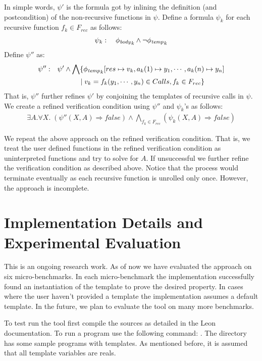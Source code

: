 \documentclass[a4paper,10pt]{article}
\begin{document}
In simple words, $\psi'$ is the formula got by inlining the definition (and postcondition) of the non-recursive functions in $\psi$.
Define a formula $\psi_k$ for each recursive function $f_k \in F_{rec}$ as follows:
%
\begin{align*}
\psi_k: \quad \mathit{\phi_{body}}_k \wedge \neg \mathit{\phi_{temp}}_k
\end{align*}
%
Define $\psi''$ as:
%
\begin{align*}
\psi'': & \quad \psi' \wedge  \bigwedge \{ \mathit{\phi_{temp}}_k[res \mapsto v_k, a_k(1) \mapsto y_1,\cdots, a_k(n) \mapsto y_n] \\
	   & \qquad \qquad  \; | \; v_k = f_k(y_1,\cdots,y_n) \in Calls, f_k \in F_{rec} \}
\end{align*}
%
That is, $\psi''$ further refines $\psi'$ by conjoining the templates of recursive calls in $\psi$.
We create a refined verification condition using $\psi''$ and $\psi_k$'s as follows:
%
\begin{align}
\exists A. \forall X. \; (\psi''(X,A) \Rightarrow false) \wedge \bigwedge_{f_k \in F_{rec}} (\psi_k(X,A) \Rightarrow false)
\end{align}

We repeat the above approach on the refined verification condition. That is, we treat the user defined functions in the refined verification condition as uninterpreted functions and try to solve for $A$. If unsuccessful we further refine the verification condition as described above. Notice that the process would terminate eventually as each recursive function is unrolled only once. 
However, the approach is incomplete. 

\section{Implementation Details and Experimental Evaluation}

This is an ongoing research work. As of now we have evaluated the approach on six micro-benchmarks. In each micro-benchmark the implementation successfully found an instantiation of the template to prove the desired property. In cases where the user haven't provided a template the implementation assumes a default template. In the future, we plan to evaluate the tool on many more benchmarks.

To test run the tool first compile the sources as detailed in the Leon documentation. To run a program  use the following command: .
The directory  has some sample programs with templates. As mentioned before, it is assumed that all template variables are reals.
\end{document}
